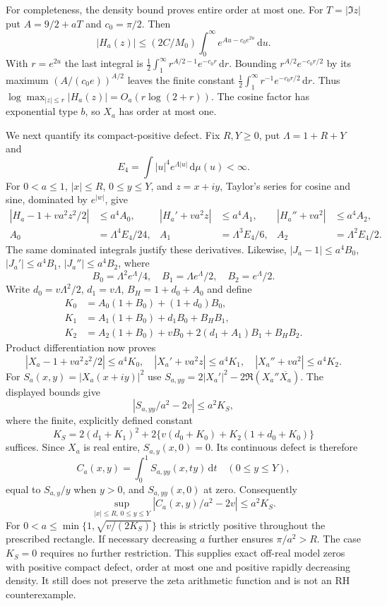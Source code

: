 \documentclass[11pt]{article}
\theoremstyle{remark}\newtheorem{remark}[theorem]{Remark}
\newcommand{\dd}{\,\mathrm d}
\begin{document}
For completeness, the density bound proves entire order at most one.
For $T=|\Im z|$ put $A=9/2+aT$ and $c_0=\pi/2$. Then
\[
 |H_a(z)|\le (2C/M_0)\int_0^\infty e^{Au-c_0e^{2u}}\dd u.
\]
With $r=e^{2u}$ the last integral is
$\tfrac12\int_1^\infty r^{A/2-1}e^{-c_0r}\dd r$.
Bounding $r^{A/2}e^{-c_0r/2}$ by its maximum
$(A/(c_0e))^{A/2}$ leaves the finite constant
$\tfrac12\int_1^\infty r^{-1}e^{-c_0r/2}\dd r$.
Thus $\log\max_{|z|\le r}|H_a(z)|=O_a(r\log(2+r))$.
The cosine factor has exponential type $b$, so $X_a$ has order at most one.

We next quantify its compact-positive defect. Fix $R,Y\ge0$, put
$\Lambda=1+R+Y$ and
\[
 E_4=\int |u|^4e^{\Lambda|u|}\dd\mu(u)<\infty.
\]
For $0<a\le1$, $|x|\le R$, $0\le y\le Y$, and $z=x+iy$, Taylor's
series for cosine and sine, dominated by $e^{|w|}$, give
\begin{align*}
 |H_a-1+va^2z^2/2|&\le a^4A_0,&
 |H_a'+va^2z|&\le a^4A_1,&
 |H_a''+va^2|&\le a^4A_2,\\
 A_0&=\Lambda^4E_4/24,& A_1&=\Lambda^3E_4/6,& A_2&=\Lambda^2E_4/2.
\end{align*}
The same dominated integrals justify these derivatives. Likewise,
$|J_a-1|\le a^4B_0$, $|J_a'|\le a^4B_1$, $|J_a''|\le a^4B_2$, where
\[
 B_0=\Lambda^2e^\Lambda/4,\quad
 B_1=\Lambda e^\Lambda/2,\quad B_2=e^\Lambda/2.
\]
Write $d_0=v\Lambda^2/2$, $d_1=v\Lambda$, $B_H=1+d_0+A_0$ and define
\begin{align*}
 K_0&=A_0(1+B_0)+(1+d_0)B_0,\\
 K_1&=A_1(1+B_0)+d_1B_0+B_HB_1,\\
 K_2&=A_2(1+B_0)+vB_0+2(d_1+A_1)B_1+B_HB_2.
\end{align*}
Product differentiation now proves
\[
 |X_a-1+va^2z^2/2|\le a^4K_0,\quad
 |X_a'+va^2z|\le a^4K_1,\quad
 |X_a''+va^2|\le a^4K_2.
\]
For $S_a(x,y)=|X_a(x+iy)|^2$ use
$S_{a,yy}=2|X_a'|^2-2\Re(X_a''\overline{X_a})$.
The displayed bounds give
\[
 |S_{a,yy}/a^2-2v|\le a^2K_S,
\]
where the finite, explicitly defined constant
\[
 K_S=2(d_1+K_1)^2+
      2\{v(d_0+K_0)+K_2(1+d_0+K_0)\}
\]
suffices. Since $X_a$ is real entire, $S_{a,y}(x,0)=0$. Its continuous
defect is therefore
\[
 C_a(x,y)=\int_0^1S_{a,yy}(x,ty)\dd t\quad(0\le y\le Y),
\]
equal to $S_{a,y}/y$ when $y>0$, and $S_{a,yy}(x,0)$ at zero. Consequently
\[
 \sup_{|x|\le R,\,0\le y\le Y}|C_a(x,y)/a^2-2v|\le a^2K_S.
\]
For $0<a\le\min\{1,\sqrt{v/(2K_S)}\}$ this is strictly positive
throughout the prescribed rectangle. If necessary decreasing $a$ further
ensures $\pi/a^2>R$. The case $K_S=0$ requires no further restriction.
This supplies exact off-real model zeros with positive compact defect,
order at most one and positive rapidly decreasing density. It still does
not preserve the zeta arithmetic function and is not an RH counterexample.
\end{document}
